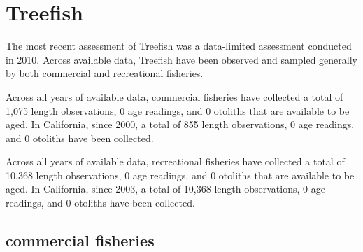\documentclass[11pt,
  english,
  letterpaper,
]{article}
\begin{document}

\hypertarget{treefish}{%
\section{Treefish}\label{treefish}}

\leavevmode\tagmcend\tagstructend


The most recent assessment of Treefish was a data-limited assessment conducted in 2010. Across available data, Treefish have been observed and sampled generally by both commercial and recreational fisheries.

\leavevmode\tagmcend\tagstructend\par


Across all years of available data, commercial fisheries have collected a total of 1,075 length observations, 0 age readings, and 0 otoliths that are available to be aged. In California, since 2000, a total of 855 length observations, 0 age readings, and 0 otoliths have been collected.

\leavevmode\tagmcend\tagstructend\par


Across all years of available data, recreational fisheries have collected a total of 10,368 length observations, 0 age readings, and 0 otoliths that are available to be aged. In California, since 2003, a total of 10,368 length observations, 0 age readings, and 0 otoliths have been collected.

\leavevmode\tagmcend\tagstructend\par


\hypertarget{commercial-fisheries-55}{%
\subsection{commercial fisheries}\label{commercial-fisheries-55}}

\leavevmode\tagmcend\tagstructend


\begingroup\fontsize{10}{12}\selectfont \begingroup\fontsize{10}{12}\selectfont
\end{document}
